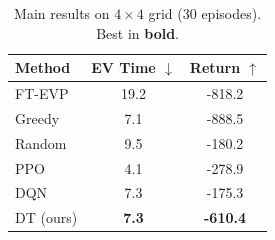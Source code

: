 \begin{table}[t]
  \caption{Main results on $4{\times}4$ grid (30 episodes). Best in \textbf{bold}.}
  \label{tab:main}
  \centering
  \begin{tabular}{lcc}
    \toprule
    \textbf{Method} & \textbf{EV Time $\downarrow$} & \textbf{Return $\uparrow$} \\
    \midrule
    FT-EVP          & 19.2 & -818.2 \\
    Greedy          & 7.1 & -888.5 \\
    Random          & 9.5 & -180.2 \\
    PPO             & 4.1 & -278.9 \\
    DQN             & 7.3 & -175.3 \\
    \midrule
    DT (ours)       & \textbf{7.3} & \textbf{-610.4} \\
    \bottomrule
  \end{tabular}
\end{table}